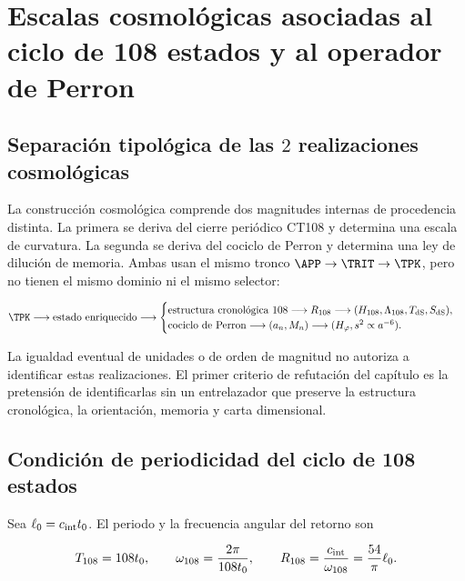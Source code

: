 \section{Escalas cosmol\'ogicas asociadas al ciclo de 108 estados y al operador de Perron}
\label{rm:ch:cosmo}

\subsection{Separación tipológica de las \(2\) realizaciones cosmológicas}

La construcci\'on cosmol\'ogica comprende dos magnitudes internas de
procedencia distinta. La primera se deriva del cierre peri\'odico CT108 y
determina una escala de curvatura. La segunda se deriva del cociclo de
Perron y determina una ley de diluci\'on de
memoria. Ambas usan el mismo tronco \(\APP\to\TRIT\to\TPK\), pero no tienen el
mismo dominio ni el mismo selector:

{\footnotesize
\begin{equation}
\TPK\longrightarrow\text{estado enriquecido}
\longrightarrow
\begin{cases}
\text{estructura cronol\'ogica }108\longrightarrow
R_{108}\longrightarrow(H_{108},\Lambda_{108},T_{\rm dS},S_{\rm dS}),\\
\text{cociclo de Perron}\longrightarrow
(a_n,M_n)\longrightarrow(H_\varphi,s^2\propto a^{-6}).
\end{cases}
\label{rm:eq:cosmo-two-branches}
\end{equation}
}

La igualdad eventual de unidades o de orden de magnitud no autoriza a
identificar estas realizaciones. El primer criterio de refutaci\'on del
cap\'itulo es la pretensi\'on de identificarlas sin un entrelazador que
preserve la estructura cronol\'ogica, la orientaci\'on,
memoria y carta dimensional.

\subsection{Condici\'on de periodicidad del ciclo de 108 estados}

Sea \(\ell_0=c_{\rm int}t_0\). El periodo y la frecuencia angular del retorno
son

\begin{equation}
T_{108}=108t_0,
\qquad
\omega_{108}=\frac{2\pi}{108t_0},
\qquad
R_{108}=\frac{c_{\rm int}}{\omega_{108}}
=\frac{54}{\pi}\ell_0.
\label{rm:eq:cosmo-R108}
\end{equation}

